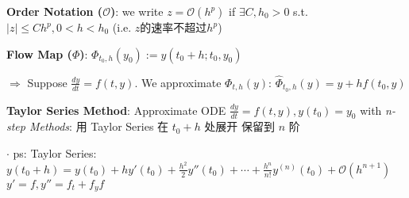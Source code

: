 \documentclass[9pt]{article}
\begin{document}
\textbf{Order Notation ($\mathcal{O}$)}: we write $z=\mathcal{O}(h^p)$ if $\exists C,h_0>0$ s.t. $|z|\leq Ch^p,0<h<h_0$ \quad (i.e. $z$的速率不超过$h^p$)

\textbf{Flow Map ($\Phi$)}: $\Phi_{t_0,h}(y_0):=y(t_0+h;t_0,y_0)$ 

\quad $\Rightarrow$ Suppose $\frac{dy}{dt}=f(t,y)$. We approximate $\Phi_{t,h}(y)$: $\widehat{\Phi}_{t_0,h}(y)= y+hf(t_0,y)$ 

\textbf{Taylor Series Method}: {\small Approximate ODE $\frac{dy}{dt}=f(t,y),y(t_0)=y_0$ with \textit{n-step Methods}: 用 Taylor Series 在 $t_0+h$ 处展开 保留到 $n$ 阶}

$\cdot$ ps: {\footnotesize Taylor Series: $y(t_0+h)=y(t_0)+hy'(t_0)+\frac{h^2}{2}y''(t_0)+\cdots+\frac{h^n}{n!}y^{(n)}(t_0)+\mathcal{O}(h^{n+1})$ \quad $y'=f,y''=f_t+f_yf$}
\end{document}
